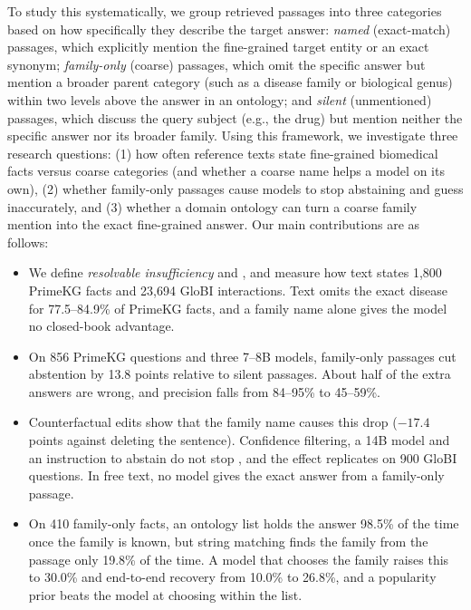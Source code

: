 To study this systematically, we group retrieved passages into three categories based on how specifically they describe the target answer: \emph{named} (exact-match) passages, which explicitly mention the fine-grained target entity or an exact synonym; \emph{family-only} (coarse) passages, which omit the specific answer but mention a broader parent category (such as a disease family or biological genus) within two levels above the answer in an ontology; and \emph{silent} (unmentioned) passages, which discuss the query subject (e.g., the drug) but mention neither the specific answer nor its broader family. Using this framework, we investigate three research questions: (1) how often reference texts state fine-grained biomedical facts versus coarse categories (and whether a coarse name helps a model on its own), (2) whether family-only passages cause models to stop abstaining and guess inaccurately, and (3) whether a domain ontology can turn a coarse family mention into the exact fine-grained answer. Our main contributions are as follows:
\begin{itemize}
\item We define \emph{resolvable insufficiency} and \clade{}, and measure how text states 1,800 PrimeKG facts and 23,694 GloBI interactions. Text omits the exact disease for 77.5--84.9\% of PrimeKG facts, and a family name alone gives the model no closed-book advantage.
\item On 856 PrimeKG questions and three 7--8B models, family-only passages cut abstention by 13.8 points relative to silent passages. About half of the extra answers are wrong, and precision falls from 84--95\% to 45--59\%.
\item Counterfactual edits show that the family name causes this drop ($-17.4$ points against deleting the sentence). Confidence filtering, a 14B model and an instruction to abstain do not stop \clade{}, and the effect replicates on 900 GloBI questions. In free text, no model gives the exact answer from a family-only passage.
\item On 410 family-only facts, an ontology list holds the answer 98.5\% of the time once the family is known, but string matching finds the family from the passage only 19.8\% of the time. A model that chooses the family raises this to 30.0\% and end-to-end recovery from 10.0\% to 26.8\%, and a popularity prior beats the model at choosing within the list.
\end{itemize}
